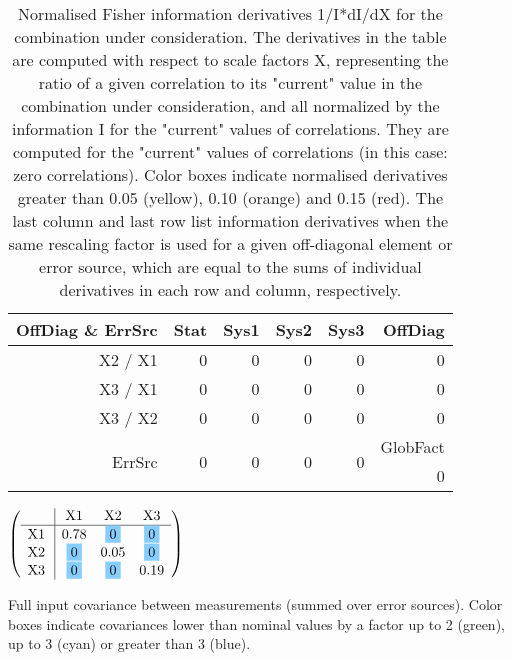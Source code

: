 \begin{table}[H]
\scriptsize
\begin{center}
\renewcommand{\arraystretch}{1.1}
\begin{tabular}{|r|rrrr|r|}
\hline
 OffDiag \& ErrSrc & {\tiny Stat} & {\tiny Sys1} & {\tiny Sys2} & {\tiny Sys3} & OffDiag\\
\hline
X2 / X1 &  0 &  0 &  0 &  0 &  0 \\
X3 / X1 &  0 &  0 &  0 &  0 &  0 \\
X3 / X2 &  0 &  0 &  0 &  0 &  0 \\
\hline
\multirow{2}{*}{ErrSrc} & \multirow{2}{*}{ 0} & \multirow{2}{*}{ 0} & \multirow{2}{*}{ 0} & \multirow{2}{*}{ 0} & GlobFact\\
 & & & & &  0 \\
\hline
\end{tabular}
\renewcommand{\arraystretch}{1}
\caption{Normalised Fisher information derivatives 1/I*dI/dX for the combination under consideration. The derivatives in the table are computed with respect to scale factors X, representing the ratio of a given correlation to its "current" value in the combination under consideration, and all normalized by the information I for the "current" values of correlations. They are computed for the "current" values of correlations (in this case: zero correlations). Color boxes indicate normalised derivatives greater than 0.05 (yellow), 0.10 (orange) and 0.15 (red). The last column and last row list information derivatives when the same rescaling factor is used for a given off-diagonal element or error source, which are equal to the sums of individual derivatives in each row and column, respectively.}
\end{center}
\end{table}
\begin{table}[H]
\scriptsize
\begin{center}
\renewcommand{\arraystretch}{1.1}
\begin{math}\left(\begin{array}{c|ccc}
 & \mathrm{X1} & 
\mathrm{X2} & 
\mathrm{X3} \\
\hline
\mathrm{X1} \hspace*{2pt} &       0.78 &  \colorbox{SkyBlue1}{$ 0$} &  \colorbox{SkyBlue1}{$ 0$} \\
\mathrm{X2} \hspace*{2pt} &  \colorbox{SkyBlue1}{$ 0$} &       0.05 &  \colorbox{SkyBlue1}{$ 0$} \\
\mathrm{X3} \hspace*{2pt} &  \colorbox{SkyBlue1}{$ 0$} &  \colorbox{SkyBlue1}{$ 0$} &       0.19 \\
\end{array}\right)\end{math}
\caption{Full input covariance between measurements (summed over error sources). Color boxes indicate covariances lower than nominal values by a factor up to 2 (green), up to 3 (cyan) or greater than 3 (blue).}
\renewcommand{\arraystretch}{1}
\end{center}
\end{table}
